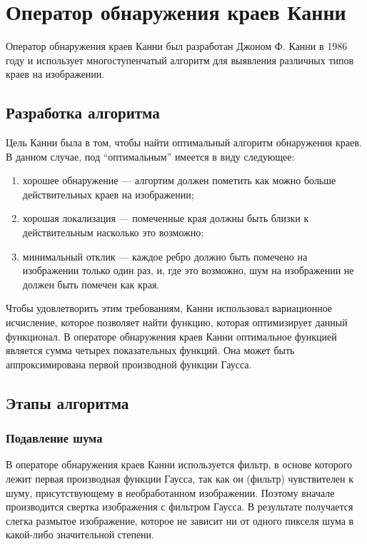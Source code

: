 \section{Оператор обнаружения краев Канни}
Оператор обнаружения краев Канни был разработан Джоном Ф. Канни в 1986 году и использует многоступенчатый алгоритм для выявления различных типов краев на изображении.

\subsection{Разработка алгоритма}
Цель Канни была в том, чтобы найти оптимальный алгоритм обнаружения краев. В данном случае, под ``оптимальным'' имеется в виду следующее:
\begin{enumerate}
  \item хорошее обнаружение --- алгортим должен пометить как можно больше действительных краев на изображении;
  \item хорошая локализация --- помеченные края должны быть близки к действительным насколько это возможно;
  \item минимальный отклик --- каждое ребро должно быть помечено на изображении только один раз, и, где это возможно, шум на изображении не должен быть помечен как края.
\end{enumerate}

Чтобы удовлетворить этим требованиям, Канни использовал вариационное исчисление, которое позволяет найти функцию, которая оптимизирует данный функционал. В операторе обнаружения краев Канни оптимальное функцией является сумма четырех показательных функций. Она может быть аппроксимирована первой производной функции Гаусса.

\subsection{Этапы алгоритма}
\subsubsection{Подавление шума}
В операторе обнаружения краев Канни используется фильтр, в основе которого лежит первая производная функции Гаусса, так как он (фильтр) чувствителен к шуму, присутствующему в необработанном изображении. Поэтому вначале производится свертка изображения с фильтром Гаусса. В результате получается слегка размытое изображение, которое не зависит ни от одного пикселя шума в какой-либо значительной степени.

